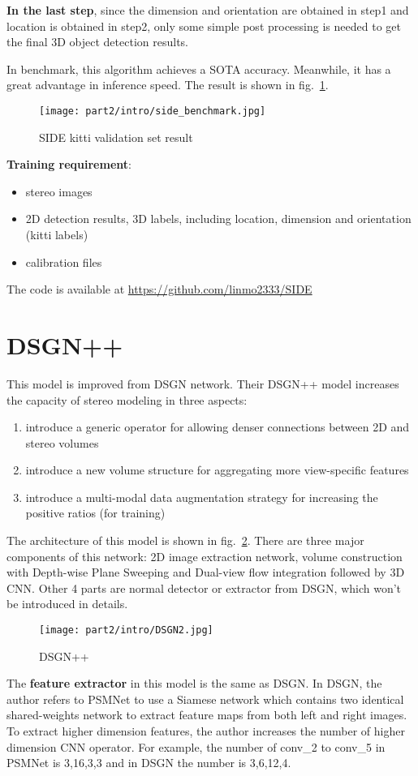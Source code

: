 \documentclass[12pt]{article}
\begin{document}
\textbf{In the last step}, since the dimension and orientation are obtained in step1 and location is obtained in step2, only some simple post processing is needed to get the final 3D object detection results.

In benchmark, this algorithm achieves a SOTA accuracy. Meanwhile, it has a great advantage in inference speed. The result is shown in fig.~\ref{side_benchmark}.
\begin{figure}[H]
    \centering
    \texttt{[image: part2/intro/side\_benchmark.jpg]}
    \caption{SIDE kitti validation set result}
    \label{side_benchmark}
\end{figure}
\textbf{Training requirement}:
\begin{itemize}
    \item stereo images
    \item 2D detection results, 3D labels, including location, dimension and orientation (kitti labels)
    \item calibration files
\end{itemize}
The code is available at \url{https://github.com/linmo2333/SIDE}
\section{DSGN++\cite{dsgn}}
This model is improved from DSGN\cite{dsgn_o} network. Their DSGN++ model increases the capacity of stereo modeling in three aspects:
\begin{enumerate}
    \item introduce a generic operator for allowing denser connections between 2D and stereo volumes
    \item introduce a new volume structure for aggregating more view-specific features
    \item introduce a multi-modal data augmentation strategy for increasing the positive ratios (for training)
\end{enumerate}
The architecture of this model is shown in fig.~\ref{dsgn}. There are three major components of this network: 2D image extraction network, volume construction with Depth-wise Plane Sweeping and Dual-view flow integration followed by 3D CNN. Other 4 parts are normal detector or extractor from DSGN, which won't be introduced in details.
\begin{figure}[H]
    \centering
    \texttt{[image: part2/intro/DSGN2.jpg]}
    \caption{DSGN++}
    \label{dsgn}
\end{figure}
The \textbf{feature extractor} in this model is the same as DSGN. In DSGN, the author refers to PSMNet\cite{plumenet} to use a Siamese network which contains two identical shared-weights network to extract feature maps from both left and right images. To extract higher dimension features, the author increases the number of higher dimension CNN operator. For example, the number of conv\_2 to conv\_5 in PSMNet is {3,16,3,3} and in DSGN the number is {3,6,12,4}.
\end{document}
